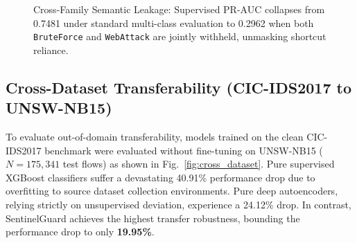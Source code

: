 \documentclass[conference,10pt,twocolumn]{IEEEtran}
\begin{document}
\begin{figure}[!t]
\centering
{}
\caption{Cross-Family Semantic Leakage: Supervised PR-AUC collapses from 0.7481 under standard multi-class evaluation to 0.2962 when both \texttt{BruteForce} and \texttt{WebAttack} are jointly withheld, unmasking shortcut reliance.}
\label{fig:joint_holdout}
\end{figure}

\subsection{Cross-Dataset Transferability (CIC-IDS2017 to UNSW-NB15)}
To evaluate out-of-domain transferability, models trained on the clean CIC-IDS2017 benchmark were evaluated without fine-tuning on UNSW-NB15 ($N=175,341$ test flows) as shown in Fig.~\ref{fig:cross_dataset}. Pure supervised XGBoost classifiers suffer a devastating 40.91\% performance drop due to overfitting to source dataset collection environments. Pure deep autoencoders, relying strictly on unsupervised deviation, experience a 24.12\% drop. In contrast, SentinelGuard achieves the highest transfer robustness, bounding the performance drop to only \textbf{19.95\%}.
\end{document}
